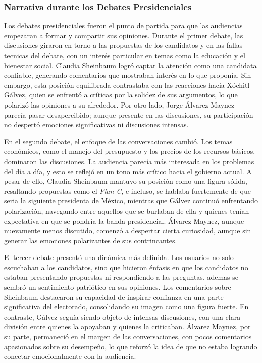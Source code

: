 \documentclass[10pt, a4paper]{article}
\begin{document}
	\subsubsection{Narrativa durante los Debates Presidenciales}
	
	Los debates presidenciales fueron el punto de partida para que las audiencias empezaran a formar y compartir sus opiniones. Durante el primer debate, las discusiones giraron en torno a las propuestas de los candidatos y en las fallas tecnicas del debate, con un interés particular en temas como la educación y el bienestar social. Claudia Sheinbaum logró captar la atención como una candidata confiable, generando comentarios que mostraban interés en lo que proponía. Sin embargo, esta posición equilibrada contrastaba con las reacciones hacia Xóchitl Gálvez, quien se enfrentó a críticas por la solidez de sus argumentos, lo que polarizó las opiniones a su alrededor. Por otro lado, Jorge Álvarez Maynez parecía pasar desapercibido; aunque presente en las discusiones, su participación no despertó emociones significativas ni discusiones intensas.
	
	En el segundo debate, el enfoque de las conversaciones cambió. Los temas económicos, como el manejo del presupuesto y los precios de los recursos básicos, dominaron las discusiones. La audiencia parecía más interesada en los problemas del día a día, y esto se reflejó en un tono más crítico hacia el gobierno actual. 	A pesar de ello, Claudia Sheinbaum mantuvo su posición como una figura sólida, resaltando propuestas como el \textit{Plan C}, e incluso, se hablaba fuertemente de que seria la siguiente presidenta de México, mientras que Gálvez continuó enfrentando polarización, navegando entre aquellos que se burlaban de ella y quienes tenían expectativa en que se pondría la banda presidencial. Álvarez Maynez, aunque nuevamente menos discutido, comenzó a despertar cierta curiosidad, aunque sin generar las emociones polarizantes de sus contrincantes.
	
	El tercer debate presentó una dinámica más definida. Los usuarios no solo escuchaban a los candidatos, sino que hicieron énfasis en que los candidatos no estaban presentando propuestas ni respondiendo a las preguntas, ademas se sembró un sentimiento patriótico en sus opiniones. Los comentarios sobre Sheinbaum destacaron su capacidad de inspirar confianza en una parte significativa del electorado, consolidando su imagen como una figura fuerte. En contraste, Gálvez seguía siendo objeto de intensas discusiones, con una clara división entre quienes la apoyaban y quienes la criticaban. Álvarez Maynez, por su parte, permaneció en el margen de las conversaciones, con pocos comentarios apasionados sobre su desempeño, lo que reforzó la idea de que no estaba logrando conectar emocionalmente con la audiencia.
	
\end{document}

